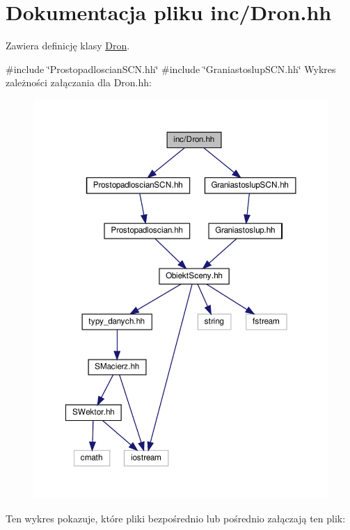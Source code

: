 \hypertarget{Dron_8hh}{}\section{Dokumentacja pliku inc/\+Dron.hh}
\label{Dron_8hh}


Zawiera definicję klasy \hyperlink{classDron}{Dron}.  


{\ttfamily \#include \char`\"{}Prostopadloscian\+S\+C\+N.\+hh\char`\"{}}\newline
{\ttfamily \#include \char`\"{}Graniastoslup\+S\+C\+N.\+hh\char`\"{}}\newline
Wykres zależności załączania dla Dron.\+hh\+:\nopagebreak
\begin{figure}[H]
\begin{center}
\leavevmode
\includegraphics[width=350pt]{Dron_8hh__incl}
\end{center}
\end{figure}
Ten wykres pokazuje, które pliki bezpośrednio lub pośrednio załączają ten plik\+:\nopagebreak
